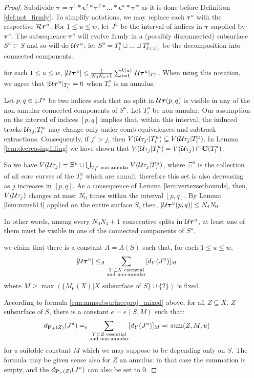 \begin{proof}
Subdivide $\bm\tau=\bm\tau^1*\bm\epsilon^2*\bm\tau^2*\ldots*\bm\epsilon^w*\bm\tau^w$ as it is done before Definition \ref{def:not_firmly}. To simplify notations, we may replace each $\bm\tau^u$ with the respective ${\mathcal R}\bm\tau^u$. For $1\leq u\leq w$, let $J^u$ be the interval of indices in $\bm\tau$ supplied by $\bm\tau^u$. The subsequence $\bm\tau^u$ will evolve firmly in a (possibly disconnected) subsurface $S^u\subset S$ and so will do ${\mathcal U}\tau^u$; let $S^u=T_1^u\sqcup\ldots\sqcup T_{k(u)}^u$ be the decomposition into connected components.

 for each $1\leq u\leq w$, $|{\mathcal U}\bm\tau^u|\leq \frac{1}{N_0N_4+1} \sum_{i=1}^{k(u)} |{\mathcal U}\bm\tau^u|_{T_i^u}$. When using this notation, we agree that $|{\mathcal U}\bm\tau^u|_{T_i^u}=0$ when $T_i^u$ is an annulus.

Let $p,q\in \mathord{\downarrow} J^u$ be two indices such that no split in ${\mathcal U}\bm\tau(p,q)$ is visible in any of the non-annular connected components of $S^u$. Let $T^u_i$ be non-annular. Our assumption on the interval of indices $[p,q]$ implies that, within this interval, the induced tracks ${\mathcal U}\tau_j|T^u_i$ may change only under comb equivalences and subtrack extractions. Consequently, if $j'>j$, then $V({\mathcal U}\tau_{j'}|T^u_i)\subseteq V({\mathcal U}\tau_j|T^u_i)$. In Lemma \ref{lem:decreasingfilling} we have shown that $V({\mathcal U}\tau_j|T^u_i)=V({\mathcal U}\tau_j)\cap \mathbf C(T^u_i)$.

So we have $V({\mathcal U}\tau_j)=\Xi^u\cup\bigcup_{T^u_i\text{ non-annular}} V({\mathcal U}\tau_j|T^u_i)$, where $\Xi^u$ is the collection of all core curves of the $T^u_i$ which are annuli; therefore this set is also decreasing as $j$ increases in $[p,q]$. As a consequence of Lemma \ref{lem:vertexsetbounds}, then, $V({\mathcal U}\tau_j)$ changes at most $N_0$ times within the interval $[p,q]$. By Lemma \ref{lem:mms614} applied on the entire surface $S$, then, $|{\mathcal U}\bm\tau^u(p,q)|\leq N_4N_0$.

In other words, among every $N_0N_4+1$ consecutive splits in ${\mathcal U}\bm\tau^u$, at least one of them must be visible in one of the connected components of $S^u$.

 we claim that there is a constant $A=A(S)$ such that, for each $1\leq u\leq w$,
$$
|{\mathcal U}\bm\tau^u|\leq_A \sum_{\substack{Y\subset X\text{ essential} \\ \text{and non-annular}}} [d_Y(J^u)]_M
$$
where $M\geq \max \left(\{M_6(X)|X\text{ subsurface of }S\}\cup\{2\}\right)$ is fixed.

According to formula \ref{eqn:mmsubsurfaceproj_mixed} above, for all $Z\subseteq X$, $Z$ subsurface of $S$, there is a constant $e=e(S,M)$ such that:
$$
d_{{\mathbf{P}_+}(Z)}(J^u)=_{e} \sum_{\substack{Y\subset Z\text{ essential} \\ \text{and non-annular}}} [d_Y(J^u)]_M \eqqcolon \mathrm{sum}(Z,M,u)
$$
for a suitable constant $M$ which we may suppose to be depending only on $S$. The formula may be given sense also for $Z$ an annulus: in that case the summation is empty, and the $d_{{\mathbf{P}_+}(Z)}(J^u)$ can also be set to $0$.


\end{proof}
